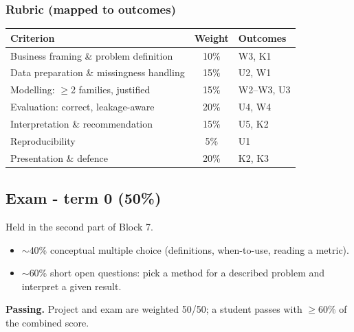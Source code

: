 \documentclass[11pt,a4paper]{article}
\begin{document}
\subsubsection{Rubric (mapped to outcomes)}
\begin{center}\small
\begin{tabular}{@{}p{6.8cm}cl@{}}
\toprule
Criterion & Weight & Outcomes \\
\midrule
Business framing \& problem definition & 10\% & W3, K1 \\
Data preparation \& missingness handling & 15\% & U2, W1 \\
Modelling: $\geq$2 families, justified & 15\% & W2--W3, U3 \\
Evaluation: correct, leakage-aware & 20\% & U4, W4 \\
Interpretation \& recommendation & 15\% & U5, K2 \\
Reproducibility & 5\% & U1 \\
Presentation \& defence & 20\% & K2, K3 \\
\bottomrule
\end{tabular}
\end{center}

\subsection{Exam - term 0 (50\%)}
Held in the second part of Block 7.
\begin{itemize}[leftmargin=1.4em,itemsep=1pt]
  \item $\sim$40\% conceptual multiple choice (definitions, when-to-use, reading a metric).
  \item $\sim$60\% short open questions: pick a method for a described problem and
        interpret a given result.
\end{itemize}
\textbf{Passing.} Project and exam are weighted 50/50; a student passes with
$\geq 60\%$ of the combined score.
\end{document}
